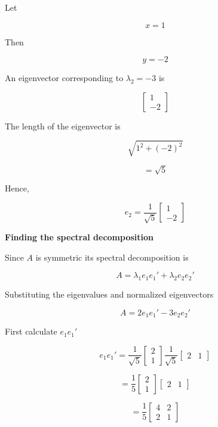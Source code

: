 \documentclass[12pt]{article}
\begin{document}
\noindent
Let

\[
x=1
\]

\noindent
Then

\[
y=-2
\]

\noindent
An eigenvector corresponding to \(\lambda_2=-3\) is

\[
\begin{bmatrix}
1\\
-2
\end{bmatrix}
\]

\noindent
The length of the eigenvector is

\[
\sqrt{1^2+(-2)^2}
\]

\[
=\sqrt{5}
\]

\noindent
Hence,

\[
\boxed{
e_2=
\frac{1}{\sqrt{5}}
\begin{bmatrix}
1\\
-2
\end{bmatrix}
}
\]

\vspace{0.7cm}

\noindent
\textbf{Finding the spectral decomposition}

\vspace{0.3cm}

\noindent
Since \(A\) is symmetric its spectral decomposition is

\[
A
=
\lambda_1e_1e_1'
+
\lambda_2e_2e_2'
\]

\noindent
Substituting the eigenvalues and normalized eigenvectors

\[
A
=
2e_1e_1'
-
3e_2e_2'
\]

\noindent
First calculate \(e_1e_1'\)

\[
e_1e_1'
=
\frac{1}{\sqrt{5}}
\begin{bmatrix}
2\\
1
\end{bmatrix}
\frac{1}{\sqrt{5}}
\begin{bmatrix}
2 & 1
\end{bmatrix}
\]

\[
=
\frac{1}{5}
\begin{bmatrix}
2\\
1
\end{bmatrix}
\begin{bmatrix}
2 & 1
\end{bmatrix}
\]

\[
=
\frac{1}{5}
\begin{bmatrix}
4 & 2\\
2 & 1
\end{bmatrix}
\]
\end{document}
